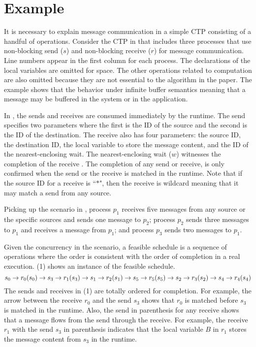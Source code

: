 \section{Example}

\examplefigone

It is necessary to explain message communication in a simple CTP consisting of a handful of operations. Consider the CTP in  that includes three processes that use non-blocking send ($s$) and non-blocking receive ($r$) for message communication. Line numbers appear in the first column for each process. The declarations of the local variables are omitted for space. The other operations related to computation are also omitted because they are not essential to the algorithm in the paper.
The example shows that the behavior under infinite buffer semantics meaning that a message may be buffered in the system or in the application.

In , the sends and receives are consumed immediately by the runtime. The send specifies two parameters where the first is the ID of the source and the second is the ID of the destination. The receive also has four parameters: the source ID, the destination ID, the local variable to store the message content, and the ID of the nearest-enclosing wait. The nearest-enclosing wait ($w$) witnesses the completion of the receive \cite{DBLP:conf/kbse/HuangMM13}. The completion of any send or receive, is only confirmed when the send or the receive is matched in the runtime. Note that if the source ID for a receive is ``$\ast$", then the receive is wildcard meaning that it may match a send from any source. 

Picking up the scenario in , process $p_1$ receives five messages from any source or the specific sources and sends one message to $p_2$; process $p_2$ sends three messages to $p_1$ and receives a message from $p_1$; and process $p_3$ sends two messages to $p_1$. 

Given the concurrency in the scenario, a feasible schedule is a sequence of operations where the order is consistent with the order of completion in a real execution. (1) shows an instance of the feasible schedule. 
\begin{equation}
\scriptsize
s_0\rightarrow r_0 (s_0)\rightarrow s_3\rightarrow r_1 (s_3)\rightarrow s_1\rightarrow r_2 (s_1)\rightarrow 
s_5\rightarrow r_5 (s_5)\rightarrow s_2\rightarrow r_3 (s_2)\rightarrow s_4\rightarrow r_4 (s_4)
\end{equation} 
The sends and receives in (1) are totally ordered for completion. For example, the arrow between the receive $r_0$ and the send $s_3$ shows that $r_0$ is matched before $s_3$ is matched in the runtime. 
Also, the send in parenthesis for any receive shows that a message flows from the send through the receive. 
For example, the receive $r_1$ with the send $s_3$ in parenthesis indicates that the local variable $B$ in $r_1$ stores the message content from $s_3$ in the runtime. 

